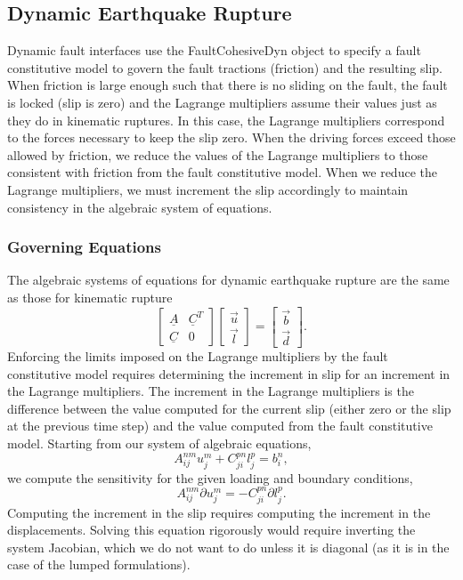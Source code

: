 \subsection{Dynamic Earthquake Rupture}

Dynamic fault interfaces use the FaultCohesiveDyn object to specify
a fault constitutive model to govern the fault tractions (friction)
and the resulting slip. When friction is large enough such that there
is no sliding on the fault, the fault is locked (slip is zero) and
the Lagrange multipliers assume their values just as they do in kinematic
ruptures. In this case, the Lagrange multipliers correspond to the
forces necessary to keep the slip zero. When the driving forces exceed
those allowed by friction, we reduce the values of the Lagrange multipliers
to those consistent with friction from the fault constitutive model.
When we reduce the Lagrange multipliers, we must increment the slip
accordingly to maintain consistency in the algebraic system of equations.


\subsubsection{Governing Equations}

The algebraic systems of equations for dynamic earthquake rupture
are the same as those for kinematic rupture
\begin{equation}
\left[\begin{array}{cc}
\underline{A} & \underline{C}^{T}\\
\underline{C} & 0
\end{array}\right]\left[\begin{array}{c}
\overrightarrow{u}\\
\overrightarrow{l}
\end{array}\right]=\left[\begin{array}{c}
\overrightarrow{b}\\
\overrightarrow{d}
\end{array}\right].
\end{equation}
Enforcing the limits imposed on the Lagrange multipliers by the fault
constitutive model requires determining the increment in slip for
an increment in the Lagrange multipliers. The increment in the Lagrange
multipliers is the difference between the value computed for the current
slip (either zero or the slip at the previous time step) and the value
computed from the fault constitutive model. Starting from our system
of algebraic equations,
\begin{equation}
A_{ij}^{nm}u_{j}^{m}+C_{ji}^{pn}l_{j}^{p}=b_{i}^{n},
\end{equation}
we compute the sensitivity for the given loading and boundary conditions,
\begin{equation}
A_{ij}^{nm}\partial u_{j}^{m}=-C_{ji}^{pn}\partial l_{j}^{p}.
\end{equation}
Computing the increment in the slip requires computing the increment
in the displacements. Solving this equation rigorously would require
inverting the system Jacobian, which we do not want to do unless it
is diagonal (as it is in the case of the lumped formulations). 


